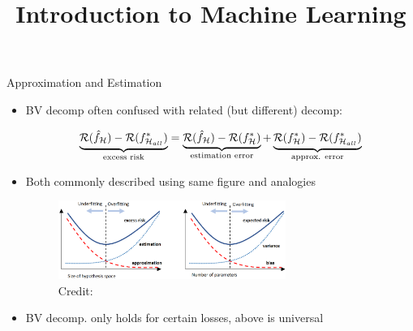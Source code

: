 \documentclass[11pt,compress,t,notes=noshow, xcolor=table]{beamer}
\title{Introduction to Machine Learning}
\begin{document}
    






\begin{vbframe}{Approximation and Estimation  }

\begin{itemize}

\item BV decomp often confused with related (but different) decomp: 

$$
    \underbrace{\mathcal{R}(\hat f_{\mathcal{H}}) - \mathcal{R}(f^{\ast}_{\mathcal{H}_{all}})}_{\text{excess risk}} = \underbrace{\mathcal{R}(\hat f_{\mathcal{H}}) - \mathcal{R}(f^{\ast}_{\mathcal{H}})}_{\text{estimation error}} + \underbrace{\mathcal{R}(f^{\ast}_{\mathcal{H}}) -  \mathcal{R}(f^{\ast}_{\mathcal{H}_{all}})}_{\text{approx. error}} 
$$

\item Both commonly described using same figure and analogies

\vfill

\begin{figure}
    \centering
    \includegraphics[width = 0.7\textwidth]{figure_man/biasvar-vs-estapprox-tradeoff.png}
    \tiny{\\ Credit: \cite{BROWN2024BIAS}}
  \end{figure}

\vfill


\item BV decomp. only holds for certain losses, above is universal

\end{itemize}

\end{vbframe}
\end{document}
